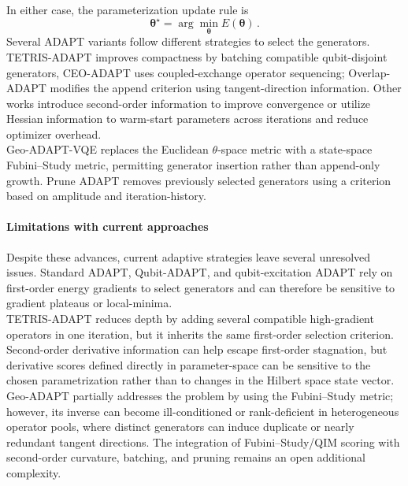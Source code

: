 \documentclass[
  reprint,
  amsmath,
  amssymb,
  aps,
  pra,
  nofootinbib,
  superscriptaddress,
  floatfix
]{revtex4-2}
\begin{document}
In either case, the parameterization update rule is
\begin{equation}
\label{eq:theta_opt}
\boldsymbol{\theta}^\star=\arg\min_{\boldsymbol{\theta}}E(\boldsymbol{\theta})\,.
\end{equation}
%
Several ADAPT variants follow different strategies to select the generators. TETRIS-ADAPT improves compactness by batching compatible qubit-disjoint generators\cite{Anastasiou2024}, CEO-ADAPT uses coupled-exchange operator sequencing\cite{Ramoa2025}; Overlap-ADAPT modifies the append criterion using tangent-direction information\cite{Feniou2023}. Other works introduce second-order information to improve convergence\cite{Grimsley2023ADAPT} or utilize Hessian information to warm-start parameters across iterations and reduce optimizer overhead\cite{Ramoa2025HessianRecycling}.\\
Geo-ADAPT-VQE replaces the Euclidean \(\theta\)-space metric with a state-space Fubini--Study metric, permitting generator insertion rather than append-only growth\cite{Sohail2026GeoADAPT}. Prune ADAPT removes previously selected generators using a criterion based on amplitude and iteration-history\cite{Vaquero2025PrunedADAPT}.

\paragraph*{Limitations with current approaches}
Despite these advances, current adaptive strategies leave several unresolved issues. Standard ADAPT, Qubit-ADAPT, and qubit-excitation ADAPT rely on first-order energy gradients to select generators\cite{Grimsley2019,Tang2021,Yordanov2021} and can therefore be sensitive to gradient plateaus or local-minima\cite{Feniou2023,Grimsley2023ADAPT}.\\
TETRIS-ADAPT reduces depth by adding several compatible high-gradient operators in one iteration, but it inherits the same first-order selection criterion\cite{Anastasiou2024}. Second-order derivative information can help escape first-order stagnation\cite{Ramoa2025HessianRecycling}, but derivative scores defined directly in parameter-space can be sensitive to the chosen parametrization rather than to changes in the Hilbert space state vector\cite{ProvostVallee1980,Stokes2020QNG}. Geo-ADAPT partially addresses the problem by using the Fubini--Study metric; however, its inverse can become ill-conditioned or rank-deficient in heterogeneous operator pools, where distinct generators can induce duplicate or nearly redundant tangent directions\cite{Sohail2026GeoADAPT}. The integration of Fubini--Study/QIM scoring with second-order curvature, batching, and pruning remains an open additional complexity.%
\end{document}

